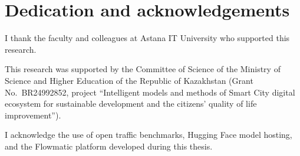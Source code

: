 %
%
\chapter{Dedication and acknowledgements}
\begin{SingleSpace}
I thank the faculty and colleagues at Astana IT University who supported this research.

This research was supported by the Committee of Science of the Ministry of Science and Higher Education of the Republic of Kazakhstan (Grant No.\ BR24992852, project ``Intelligent models and methods of Smart City digital ecosystem for sustainable development and the citizens' quality of life improvement'').

I acknowledge the use of open traffic benchmarks, Hugging Face model hosting, and the Flowmatic platform developed during this thesis.
\end{SingleSpace}
\clearpage

